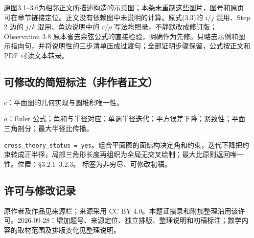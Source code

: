 \documentclass[UTF8,11pt]{ctexart}
\theoremstyle{definition}
\begin{document}
原图3.1--3.6为相邻正文所描述构造的示意图；本条未重制这些图片，图号和原页可在章节链接定位。正文没有依赖图中未说明的计算。原式(3.3)的 $i/j$ 混用、Step 2 边的 $j/k$ 混用、角边说明中的 $r/\rho$ 写法均照录，不静默改成修订版；Observation 3.8 原本省去余弦公式的直接检验，明确作为先修。只略去示例和图示指向句，并将说明性的三步清单压成过渡句；全部证明步骤保留，公式按正文和 PDF 可读文本转录。
\subsection*{可修改的简短标注（非作者正文）}
$c$：平面图的几何实现与圆堆积唯一性。

$a$：Euler 公式；角和与半径对应；单调半径迭代；平方误差下降；紧致性；平面三角剖分；最大半径比传播。

\texttt{cross\_theory\_status = yes}。组合平面图的面结构决定角和约束，迭代下降把约束转成正半径，局部三角形长度再组织为全局无交叉绘制；最大比原则返回唯一性。位置：\S3.2.1--3.2.3。
标签为非穷尽、可修改初稿。
\subsection*{许可与修改记录}
原作者及作品见来源栏；来源采用 CC BY 4.0。本题证摘录和附加整理沿用该许可。2026-09-28：增加题号、来源定位、独立排版、整理说明和初稿标注；数学内容的取材范围及排版变化见整理说明。
\end{document}
